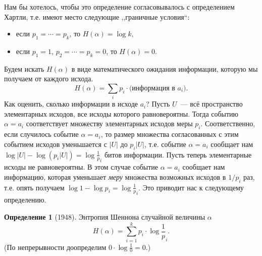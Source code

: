 \documentclass[12pt]{article}
\theoremstyle{definition}
\newtheorem{definition}{Определение}[section]
\theoremstyle{plain}
\theoremstyle{remark}
\begin{document}
Нам бы хотелось, чтобы это определение согласовывалось с определением Хартли, т.е. имеют место следующие ,,граничные условия``:
\begin{itemize}
\item если \(p_1=\dotsb=p_k\), то \(H(\alpha) = \log k\),
\item если \(p_1=1\), \(p_2=\dotsb=p_k=0\), то \(H(\alpha) = 0\).
\end{itemize}
Будем искать \(H(\alpha)\) в виде математического ожидания информации, которую мы получаем от каждого исхода.
\[H(\alpha) = \sum_i p_i\cdot \text{(информация в $a_i$)}.\]
Как оценить, сколько информации в исходе $a_i$? Пусть $U$~--- всё пространство элементарных исходов,
все исходы которого равновероятны. Тогда событию $\alpha = a_i$ соответствует множеству элементарных исходов меры $p_i$. Соответственно, если случилось событие $\alpha = a_i$, то размер множества согласованных с этим событием исходов уменьшается с $|U|$ до $p_i|U|$,
т.е. событие $\alpha = a_i$ сообщает нам $\log|U| - \log(p_i|U|) = \log\frac1p_i$ битов информации.
Пусть теперь элементарные исходы не равновероятны. В этом случае событие $\alpha = a_i$ сообщает нам информацию, которая уменьшает \emph{меру} множества возможных исходов в $1/p_i$ раз, т.е. опять получаем $\log1 - \log p_i = \log\frac1p_i$.
Это приводит нас к следующему определению.
\begin{definition}[1948]
Энтропия Шеннона случайной величины \(\alpha\) 
\[
H(\alpha) = \sum_{i=1}^k p_i\cdot\log\frac1p_i.
\]
(По непрерывности доопределим \(0\cdot \log\frac10 = 0\).)
\end{definition}
\end{document}
